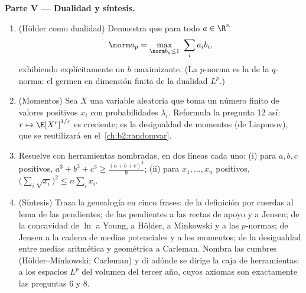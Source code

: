 \begin{problem}
\medskip
\noindent\textbf{Parte V --- Dualidad y síntesis.}
\begin{enumerate}[resume]
  \item (Hölder como dualidad) Demuestra que para todo $a \in \R^n$
        \[
        \norm a_p = \max_{\norm b_q \leq 1}\ \sum_i a_ib_i ,
        \]
        exhibiendo explícitamente un $b$ maximizante. (La $p$-norma
        es la  de la $q$-norma: el germen en dimensión finita
        de la dualidad $L^p$.)
  \item (Momentos) Sea $X$ una variable aleatoria que toma un número
        finito de valores positivos $x_i$ con probabilidades
        $\lambda_i$. Reformula la pregunta 12 así: $r \mapsto
        \E[X^r]^{1/r}$ es creciente; es la desigualdad de momentos
        (de Liapunov), que se reutilizará en el~\cref{ch:b2:randomvar}.
  \item Resuelve con herramientas nombradas, en dos líneas cada uno:
        (i) para $a, b, c$ positivos, $a^3 + b^3 + c^3 \geq
        \frac{(a+b+c)^3}{9}$; (ii) para $x_1, \dots, x_n$ positivos,
        $\bigl(\sum_i\sqrt{x_i}\bigr)^2 \leq n\sum_i x_i$.
  \item (Síntesis) Traza la genealogía en cinco frases: de la
        definición por cuerdas al lema de las pendientes; de las
        pendientes a las rectas de apoyo y a Jensen; de la
        concavidad de $\ln$ a Young, a Hölder, a Minkowski y a las
        $p$-normas; de Jensen a la cadena de medias potenciales y a
        los momentos; de la desigualdad entre medias aritmética y
        geométrica a Carleman. Nombra las cumbres
        (Hölder--Minkowski; Carleman) y di adónde se dirige la caja
        de herramientas: a los espacios $L^p$ del volumen del tercer
        año, cuyos axiomas son exactamente las preguntas 6 y 8.
\end{enumerate}
\end{problem}

